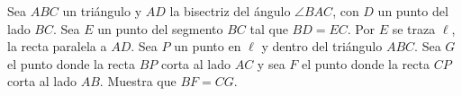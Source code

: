 Sea $ABC$ un triángulo y $AD$ la bisectriz del ángulo $\angle BAC$, con $D$ un punto del lado $BC$. Sea $E$ un punto del segmento $BC$ tal que $BD=EC$. Por $E$ se traza $\ell$, la recta paralela a $AD$. Sea $P$ un punto en $\ell$ y dentro del triángulo $ABC$. Sea $G$ el punto donde la recta $BP$ corta al lado $AC$ y sea $F$ el punto donde la recta $CP$ corta al lado $AB$. Muestra que $BF=CG$.